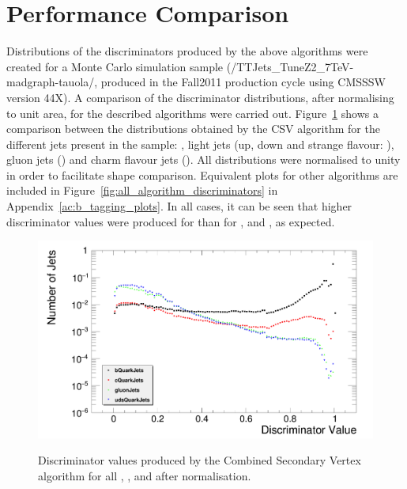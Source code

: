 \section{Performance Comparison}
\label{s:performance_comparison}

Distributions of the discriminators produced by the above algorithms were created for a \ttbar \MADGRAPH Monte
Carlo simulation sample (/TTJets\_TuneZ2\_7TeV-madgraph-tauola/, produced in the Fall2011 production cycle
using CMSSSW version 44X). A comparison of the discriminator distributions, after normalising to unit area,
for the described algorithms were carried out. Figure~\ref{fig:CSV_discriminators} shows a comparison between
the distributions obtained by the CSV algorithm for the different jets present in the sample: \bjets, light
jets (up, down and strange flavour: \udsjets), gluon jets (\gjets) and charm flavour jets (\cjets). All
distributions were normalised to unity in order to facilitate shape comparison. Equivalent plots for other
algorithms are included in Figure~\ref{fig:all_algorithm_discriminators} in Appendix~\ref{ac:b_tagging_plots}.
In all cases, it can be seen that higher discriminator values were produced for \bjets than for \udsjets,
\gjets and \cjets, as expected.

\begin{figure}[hbtp]
   \centering
     \includegraphics[width=\textwidth]{Chapters/06_BTag_Study/Images/CombinedSecondaryVertex_norm_discriminator_combined}\\
     \caption[Discriminator values produced by the Combined Secondary Vertex algorithm after
     normalisation.]{Discriminator values produced by the Combined Secondary Vertex algorithm for all \bjets,
     \cjets, \gjets and \udsjets after normalisation.}
     \label{fig:CSV_discriminators}
\end{figure}

